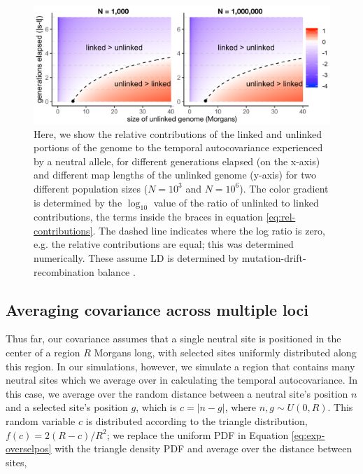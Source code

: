\documentclass[11pt]{article}
\begin{document}
{\begin{figure}[!ht]
  \centering
  \includegraphics[]{./images/unlinked_linked_contributions.pdf}

  \caption{Here, we show the relative contributions of the linked and unlinked
    portions of the genome to the temporal autocovariance experienced by a
    neutral allele, for different generations elapsed (on the x-axis) and
    different map lengths of the unlinked genome (y-axis) for two different
    population sizes ($N=10^3$ and $N=10^6$). The color gradient is determined
    by the $\log_{10}$ value of the ratio of unlinked to linked contributions,
    the terms inside the braces in equation \eqref{eq:rel-contributions}. The
    dashed line indicates where the log ratio is zero, e.g. the relative
    contributions are equal; this was determined numerically. These assume LD
    is determined by mutation-drift-recombination balance
  \parencite{Tomoko_Ohta1971-hb}.}

  \label{fig:linked-unlinked}
\end{figure}

}


\subsection{Averaging covariance across multiple loci}

Thus far, our covariance assumes that a single neutral site is positioned in
the center of a region $R$ Morgans long, with selected sites uniformly
distributed along this region. In our simulations, however, we simulate a
region that contains many neutral sites which we average over in calculating
the temporal autocovariance. In this case, we average over the random distance
between a neutral site's position $n$ and a selected site's position $g$, which
is $c = |n - g|$, where $n, g \sim U(0, R)$. This random variable $c$ is
distributed according to the triangle distribution, $f(c) = 2(R-c) / R^2$; we
replace the uniform PDF in Equation \eqref{eq:exp-overselpos} with the triangle
density PDF and average over the distance between sites,
\end{document}
